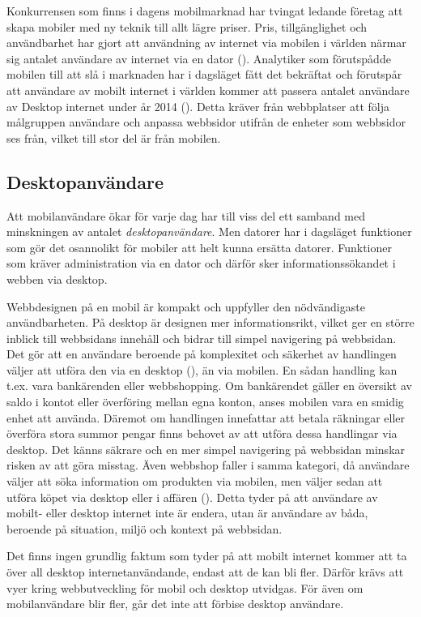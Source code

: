 \documentclass[11pt]{article}
\begin{document}
Konkurrensen som finns i dagens mobilmarknad har tvingat ledande företag att skapa mobiler med ny teknik till allt lägre priser. Pris, tillgänglighet och användbarhet har gjort att användning av internet via mobilen i världen närmar sig antalet användare av internet via en dator (\cite{morganstanley}). Analytiker som förutspådde mobilen till att slå i marknaden har i dagsläget fått det bekräftat och förutspår att användare av mobilt internet i världen kommer att passera antalet användare av Desktop internet  under år 2014 (\cite{morganstanley}). Detta kräver från webbplatser att följa målgruppen användare och anpassa webbsidor utifrån de enheter som webbsidor ses från, vilket till stor del är från mobilen.

\subsection{Desktopanvändare}
Att mobilanvändare ökar för varje dag har till viss del ett samband med minskningen av antalet \textit{desktopanvändare}. Men datorer har i dagsläget funktioner som gör det osannolikt för mobiler att helt kunna ersätta datorer. Funktioner som kräver administration via en dator och därför sker informationssökandet i webben via desktop. 

Webbdesignen på en mobil är kompakt och uppfyller den nödvändigaste användbarheten. På desktop är designen mer informationsrikt, vilket ger en större inblick till webbsidans innehåll och bidrar till simpel navigering på webbsidan. Det gör att en användare beroende på komplexitet och säkerhet av handlingen väljer att utföra den via en desktop (\cite{userbeh}), än via mobilen. En sådan handling kan t.ex. vara bankärenden eller webbshopping. Om bankärendet gäller en översikt av saldo i kontot eller överföring mellan egna konton, anses mobilen vara en smidig enhet att använda. Däremot om handlingen innefattar att betala räkningar eller överföra stora summor pengar finns behovet av att utföra dessa handlingar via desktop. Det känns säkrare och en mer simpel navigering på webbsidan minskar risken av att göra misstag. Även webbshop faller i samma kategori, då användare väljer att söka information om produkten via mobilen, men väljer sedan att utföra köpet via desktop eller i affären (\cite{userbeh}). Detta tyder på att användare av mobilt- eller desktop internet inte är endera, utan är användare av båda, beroende på situation, miljö och kontext på webbsidan.

Det finns ingen grundlig faktum som tyder på att mobilt internet kommer att ta över all desktop internetanvändande, endast att de kan bli fler. Därför krävs att vyer kring webbutveckling för mobil och desktop utvidgas. För även om mobilanvändare blir fler, går det inte att förbise desktop användare.
\newpage
\end{document}
